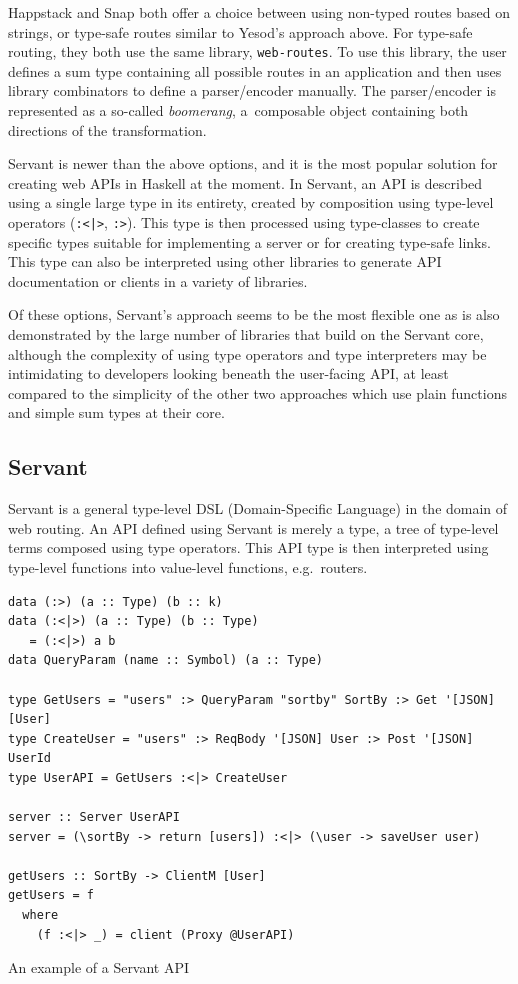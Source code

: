 \documentclass[english,zadani,odsaz]{fitthesis}
\begin{document}
Happstack and Snap both offer a choice between using non-typed routes based on
strings, or type-safe routes similar to Yesod's approach above. For type-safe
routing, they both use the same library, \texttt{web-routes}. To use this library, the
user defines a sum type containing all possible routes in an application and
then uses library combinators to define a parser/encoder manually. The
parser/encoder is represented as a so-called \emph{boomerang}, a~composable object
containing both directions of the transformation.

Servant is newer than the above options, and it is the most popular solution for
creating web APIs in Haskell at the moment. In Servant, an API is described
using a single large type in its entirety, created by composition using
type-level operators (\texttt{:<|>}, \texttt{:>}). This type is then processed using type-classes
to create specific types suitable for implementing a server or for creating
type-safe links. This type can also be interpreted using other libraries to
generate API documentation or clients in a variety of libraries.

Of these options, Servant's approach seems to be the most flexible one as is
also demonstrated by the large number of libraries that build on the Servant
core, although the complexity of using type operators and type interpreters may
be intimidating to developers looking beneath the user-facing API, at least
compared to the simplicity of the other two approaches which use plain functions
and simple sum types at their core.

\subsection{Servant}
\label{sec:org2402350}
Servant is a general type-level DSL (Domain-Specific Language) in the domain of
web routing. An API defined using Servant is merely a type, a tree of type-level
terms composed using type operators. This API type is then interpreted using
type-level functions into value-level functions, e.g.~routers.

\begin{listing}[tb]
\begin{verbatim}
data (:>) (a :: Type) (b :: k)
data (:<|>) (a :: Type) (b :: Type)
   = (:<|>) a b
data QueryParam (name :: Symbol) (a :: Type)

type GetUsers = "users" :> QueryParam "sortby" SortBy :> Get '[JSON] [User]
type CreateUser = "users" :> ReqBody '[JSON] User :> Post '[JSON] UserId
type UserAPI = GetUsers :<|> CreateUser

server :: Server UserAPI
server = (\sortBy -> return [users]) :<|> (\user -> saveUser user)

getUsers :: SortBy -> ClientM [User]
getUsers = f
  where
    (f :<|> _) = client (Proxy @UserAPI)
\end{verbatim}
\caption{An example of a Servant API \label{servant-api}}
\end{listing}
\end{document}
